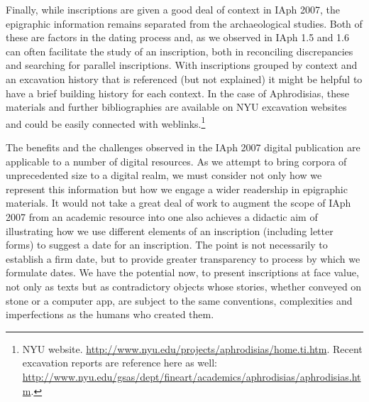 \documentclass[amsthm,ebook]{saparticle}
\begin{document}
Finally, while inscriptions are given a good deal of context in IAph 2007, the epigraphic information remains
separated from the archaeological studies. Both of these are factors in the dating process and, as we observed in IAph
1.5 and 1.6 can often facilitate the study of an inscription, both in reconciling discrepancies and searching for
parallel inscriptions. With inscriptions grouped by context and an excavation history that is referenced (but not
explained) it might be helpful to have a brief building history for each context. In the case of Aphrodisias, these
materials and further bibliographies are available on NYU excavation websites and could be easily connected with
weblinks.\footnote{ NYU website. \url{http://www.nyu.edu/projects/aphrodisias/home.ti.htm}. Recent excavation reports are
reference here as well: \url{http://www.nyu.edu/gsas/dept/fineart/academics/aphrodisias/aphrodisias.htm}.}




The benefits and the challenges observed in the IAph 2007 digital publication are applicable to a number of digital
resources. As we attempt to bring corpora of unprecedented size to a digital realm, we must consider not only how we
represent this information but how we engage a wider readership in epigraphic materials. It would not take a great deal
of work to augment the scope of IAph 2007 from an academic resource into one also achieves a didactic aim of
illustrating how we use different elements of an inscription (including letter forms) to suggest a date for an inscription. The point is not necessarily to establish a firm date, but to provide greater transparency to process by which we formulate dates. We have the potential now, to present inscriptions at
face value, not only as texts but as contradictory objects whose stories, whether conveyed on stone or a computer app,
are subject to the same conventions, complexities and imperfections as the humans who created them. 

\nocite{roueche2004} 
\nocite{buraselis2000}
\nocite{bruun2015}
\nocite{calabi1991}
\nocite{chaniotis2004}
\nocite{calder1962}
\nocite{panciera1995}



\end{document}
